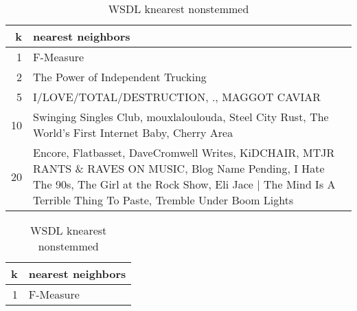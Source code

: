 \documentclass[letterpaper,10pt]{article}
\begin{document}
\begin{table}[H]
\centering
\setlength\tabcolsep{2pt}
\begin{minipage}{0.48\textwidth}
\centering
\begin{tabular}{rp{5cm}}
\hline
   k & nearest neighbors                                                                                                                                                                                                         \\
\hline
   1 & F-Measure                                                                                                                                                                                                                 \\ \hline
   2 & The Power of Independent Trucking                                                                                                                                                                                         \\ \hline
   5 & I/LOVE/TOTAL/DESTRUCTION, ., MAGGOT CAVIAR                                                                                                                                                                                \\ \hline
  10 & Swinging Singles Club, mouxlaloulouda, Steel City Rust, The World's First Internet Baby, Cherry Area                                                                                                                      \\ \hline
  20 & Encore, Flatbasset, DaveCromwell Writes, KiDCHAIR, MTJR RANTS \& RAVES ON MUSIC, Blog Name Pending, I Hate The 90s, The Girl at the Rock Show, Eli Jace | The Mind Is A Terrible Thing To Paste, Tremble Under Boom Lights \\
\hline
\end{tabular}
\caption{WSDL knearest nonstemmed}
\label{tab:wsldknns} 
\end{minipage}%
\hfill
\begin{minipage}{0.48\textwidth}
\centering
\begin{tabular}{rp{5cm}}
\hline
   k & nearest neighbors                                                                                                                                                                                                           \\
\hline
   1 & F-Measure                                                                                                                                                                                                                   \\ \hline

\end{tabular}
\end{minipage}
\end{table}
\end{document}
